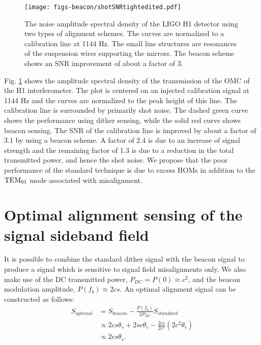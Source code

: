 %
\begin{figure}
  \begin{center}
  \leavevmode
  \texttt{[image: figs-beacon/shotSNRtightedited.pdf]}
  \end{center}
  \caption[An instance of the noise performance of beacon alignment sensing.]{The noise amplitude spectral density of the LIGO H1 detector using two types of alignment schemes. The curves are normalized to a calibration line at 1144 Hz.  The small line structures are resonances of the suspension wires supporting the mirrors. The beacon scheme shows an SNR improvement of about a factor of 3.}
  \label{fig:shotnoise}
\end{figure}

Fig. %
\ref{fig:shotnoise} shows the amplitude spectral density of the transmission of the OMC of the H1 interferometer. %
The plot is centered on an injected calibration signal at 1144 Hz and the curves are normalized to the peak height of this line. %
The calibration line is surrounded by primarily shot noise. %
The dashed green curve shows the performance using dither sensing, while the solid red curve shows beacon sensing. %
The SNR of the calibration line is improved by about a factor of 3.1 by using a beacon scheme. %
A factor of 2.4 is due to an increase of signal strength and the remaining factor of 1.3 is due to a reduction in the total transmitted power, and hence the shot noise. %
We propose that the poor performance of the standard technique is due to excess HOMs in addition to the ${\rm TEM}_{01}$ mode associated with misalignment.

\section{Optimal alignment sensing of the signal sideband field}
It is possible to combine the standard dither signal with the beacon signal to produce a signal which is sensitive to signal field misalignments only. %
We also make use of the DC transmitted power, $P_{DC} = P(0) \approx c^2$, and the beacon modulation amplitude, $P(f_b) \approx 2cs$. %
An optimal alignment signal can be constructed as follows:
%
\begin{align}
\label{eq:optsig}
S_{optimal} &= S_{beacon} - \frac{P(f_b)}{2P_{DC}} S_{standard}\\
\nonumber &\propto 2cs\theta_s+2sc\theta_c-\frac{2cs}{2c^2}(2c^2\theta_c) \\
\nonumber &\propto 2cs\theta_s.
\end{align}
%

